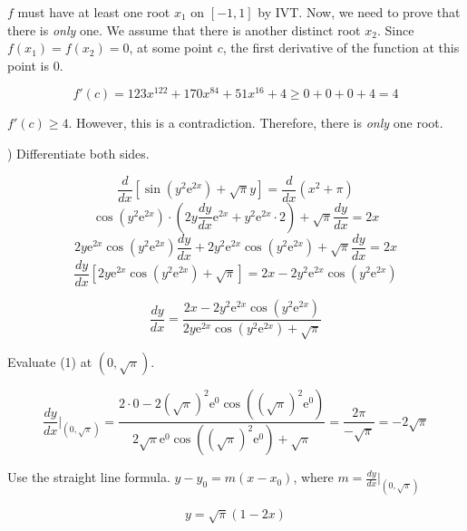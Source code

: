 \documentclass{article}
\begin{document}
\hfill

\noindent $f$ must have at least one root $x_1$ on $[-1, 1]$ by IVT. Now, we need to prove that there is \textit{only} one. We assume that there is another distinct root $x_2$. Since $f(x_1) = f(x_2) = 0$, at some point $c$, the first derivative of the function at this point is $0$.

\begin{equation*}f'(c) = 123x^{122}+170x^{84} + 51x^{16} + 4 \geq 0+ 0+ 0+ 4 = 4\end{equation*}

\hfill

\noindent $f'(c)\geq4$. However, this is a contradiction. Therefore, there is \textit{only} one root.

\hfill

) Differentiate both sides.

\[\frac d{dx}\left[\sin(y^2\mathrm{e}^{2x})+\sqrt\pi y\right] =\frac {d}{dx} \left(x^2+\pi\right)\]
\[\cos\left(y^2\mathrm{e}^{2x}\right)\cdot\left(2y{\frac{dy}{dx}\mathrm{e}^{2x}}+y^2\mathrm{e}^{2x}\cdot2\right)+\sqrt\pi\frac{dy}{dx}=2x\]
\[2y{\mathrm{e}^{2x}}\cos\left(y^2\mathrm{e}^{2x}\right)\frac{dy}{dx}+2y^2\mathrm{e}^{2x}\cos\left(y^2\mathrm{e}^{2x}\right)+\sqrt\pi\frac{dy}{dx}=2x\]
\[\frac{dy}{dx}\left[2y\mathrm{e}^{2x}\cos\left(y^2\mathrm{e}^{2x}\right)+\sqrt\pi\right]=2x-2y^2{\mathrm{e}^{2x}}\cos\left(y^2\mathrm{e}^{2x}\right)\]

\begin{equation}\frac{dy}{dx}=\frac{2x-2y^2{\mathrm{e}^{2x}}\cos\left(y^2\mathrm{e}^{2x}\right)}{2y\mathrm{e}^{2x}\cos\left(y^2\mathrm{e}^{2x}\right)+\sqrt\pi}\end{equation}

\hfill

\noindent Evaluate (1) at $\left(0, \sqrt\pi\right)$.

\begin{equation*}\frac{dy}{dx}\Bigg|_{\left(0, \sqrt\pi\right)}=\frac{2\cdot0-2\left(\sqrt\pi\right)^2{\mathrm{e}^{0}}\cos\left(\left(\sqrt\pi\right)^2\mathrm{e}^{0}\right)}{2\sqrt\pi\mathrm{e}^{0}\cos\left(\left(\sqrt\pi\right)^2\mathrm{e}^{0}\right)+\sqrt\pi}=\frac{2\pi}{-\sqrt\pi}=-2\sqrt\pi\end{equation*}

\hfill

\noindent Use the straight line formula. $y-y_0 = m(x-x_0)$, where $\displaystyle m=\frac{dy}{dx}\Bigg|_{\left(0, \sqrt\pi\right)}$

\begin{equation*}\boxed{y=\sqrt\pi(1-2x)}\end{equation*}
\end{document}
